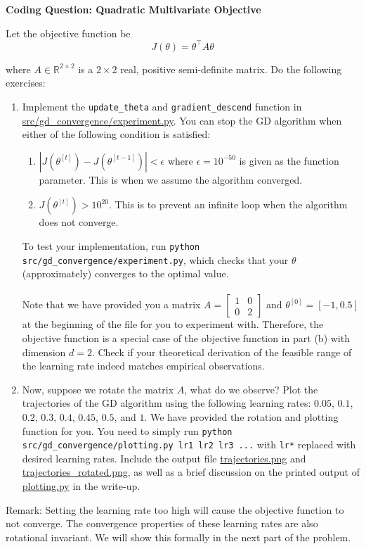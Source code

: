 \item {} {\bf Coding Question: Quadratic Multivariate Objective}

Let the objective function be 
\begin{equation*}
	J(\theta) = \theta^\top A\theta
\end{equation*}

where $A\in\mathbb{R}^{2\times 2}$ is a $2 \times 2$ real, positive semi-definite matrix. Do the following exercises:

\begin{enumerate}
	\item Implement the \texttt{update\_theta} and \texttt{gradient\_descend} function in \url{src/gd_convergence/experiment.py}. You can stop the GD algorithm when either of the following condition is satisfied:
	\begin{enumerate}
		\item $|J(\theta^{[t]}) - J(\theta^{[t-1]})| < \epsilon$ where $\epsilon=10^{-50}$ is given as the function parameter. This is when we assume the algorithm converged. 
		\item $J(\theta^{[t]}) > 10^{20}$. This is to prevent an infinite loop when the algorithm does not converge.
	\end{enumerate}
	To test your implementation, run \texttt{python src/gd\_convergence/experiment.py}, which checks that your $\theta$ (approximately) converges to the optimal value. \\
	\\
	Note that we have provided you a matrix $A=\begin{bmatrix} 1 & 0 \\ 0 & 2 \end{bmatrix}$ and $\theta^{[0]} = [-1, 0.5]$ at the beginning of the file for you to experiment with. Therefore, the objective function is a special case of the objective function in part (b) with dimension $d=2$. Check if your theoretical derivation of the feasible range of the learning rate indeed matches empirical observations. 
	\item Now, suppose we rotate the matrix $A$, what do we observe?
	 Plot the trajectories of the GD algorithm using the following learning rates: $0.05$, $0.1$, $0.2$, $0.3$, $0.4$, $0.45$, $0.5$, and $1$. We have provided the rotation and plotting function for you. You need to simply run \texttt{python src/gd\_convergence/plotting.py lr1 lr2 lr3 ...} with \texttt{lr*} replaced with desired learning rates. Include the output file \url{trajectories.png} and \url{trajectories_rotated.png}, as well as a brief discussion on the printed output of \url{plotting.py} in the write-up.
\end{enumerate}

Remark: Setting the learning rate too high will cause the objective function to not converge. The convergence properties of these learning rates are also rotational invariant. We will show this formally in the next part of the problem.